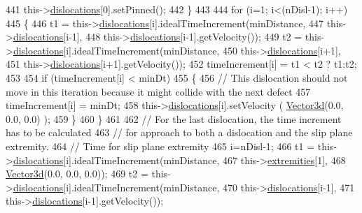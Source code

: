 \begin{DoxyCode}
441        this->\hyperlink{classSlipPlane_ad92c7c409f7e161db449528389180910}{dislocations}[0].setPinned();
442      \}
443 
444    \textcolor{keywordflow}{for} (i=1; i<(nDisl-1); i++)
445      \{
446        t1 = this->\hyperlink{classSlipPlane_ad92c7c409f7e161db449528389180910}{dislocations}[i].idealTimeIncrement(minDistance,
447                                                      this->\hyperlink{classSlipPlane_ad92c7c409f7e161db449528389180910}{dislocations}[i-1],
448                                                      this->\hyperlink{classSlipPlane_ad92c7c409f7e161db449528389180910}{dislocations}[i-1].getVelocity());
449        t2 = this->\hyperlink{classSlipPlane_ad92c7c409f7e161db449528389180910}{dislocations}[i].idealTimeIncrement(minDistance,
450                                                      this->\hyperlink{classSlipPlane_ad92c7c409f7e161db449528389180910}{dislocations}[i+1],
451                                                      this->\hyperlink{classSlipPlane_ad92c7c409f7e161db449528389180910}{dislocations}[i+1].getVelocity());
452        timeIncrement[i] = t1 < t2 ? t1:t2;
453 
454        \textcolor{keywordflow}{if} (timeIncrement[i] < minDt)
455          \{
456            \textcolor{comment}{// This dislocation should not move in this iteration because it might collide with the next
       defect}
457            timeIncrement[i] = minDt;
458            this->\hyperlink{classSlipPlane_ad92c7c409f7e161db449528389180910}{dislocations}[i].setVelocity ( \hyperlink{classVector3d}{Vector3d}(0.0, 0.0, 0.0) );
459          \}
460      \}
461 
462    \textcolor{comment}{// For the last dislocation, the time increment has to be calculated}
463    \textcolor{comment}{// for approach to both a dislocation and the slip plane extremity.}
464    \textcolor{comment}{// Time for slip plane extremity}
465    i=nDisl-1;
466    t1 = this->\hyperlink{classSlipPlane_ad92c7c409f7e161db449528389180910}{dislocations}[i].idealTimeIncrement(minDistance,
467                                                  this->\hyperlink{classSlipPlane_abbdbe6ed805faf3777b54ff55a9c089c}{extremities}[1],
468                                                  \hyperlink{classVector3d}{Vector3d}(0.0, 0.0, 0.0));
469    t2 = this->\hyperlink{classSlipPlane_ad92c7c409f7e161db449528389180910}{dislocations}[i].idealTimeIncrement(minDistance,
470                                                  this->\hyperlink{classSlipPlane_ad92c7c409f7e161db449528389180910}{dislocations}[i-1],
471                                                  this->\hyperlink{classSlipPlane_ad92c7c409f7e161db449528389180910}{dislocations}[i-1].getVelocity());

\end{DoxyCode}
